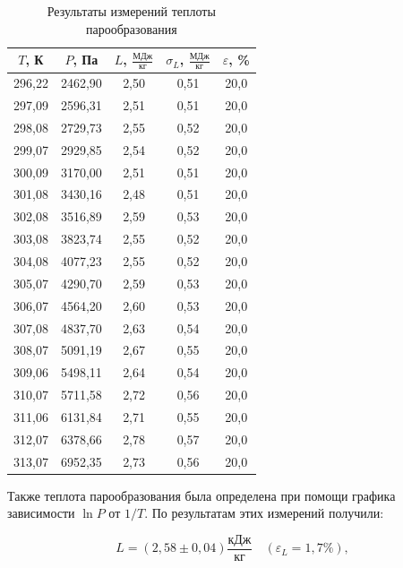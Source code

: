 \documentclass[a4paper, 12pt]{article}
\begin{document}
    \begin{table}[H]
        \centering
        \begin{tabular}{|c|c|c|c|c|}
        \hline
        $ T $, К & $P$, Па & $L$, $\frac{\text{МДж}}{\text{кг}}$ & $\sigma_L $, $\frac{\text{МДж}}{\text{кг}}$ & $\varepsilon $, \% \\ \hline
        296,22 & 2462,90 & 2,50 & 0,51 & 20,0 \\ \hline
        297,09 & 2596,31 & 2,51 & 0,51 & 20,0 \\ \hline
        298,08 & 2729,73 & 2,55 & 0,52 & 20,0 \\ \hline
        299,07 & 2929,85 & 2,54 & 0,52 & 20,0 \\ \hline
        300,09 & 3170,00 & 2,51 & 0,51 & 20,0 \\ \hline
        301,08 & 3430,16 & 2,48 & 0,51 & 20,0 \\ \hline
        302,08 & 3516,89 & 2,59 & 0,53 & 20,0 \\ \hline
        303,08 & 3823,74 & 2,55 & 0,52 & 20,0 \\ \hline
        304,08 & 4077,23 & 2,55 & 0,52 & 20,0 \\ \hline
        305,07 & 4290,70 & 2,59 & 0,53 & 20,0 \\ \hline
        306,07 & 4564,20 & 2,60 & 0,53 & 20,0 \\ \hline
        307,08 & 4837,70 & 2,63 & 0,54 & 20,0 \\ \hline
        308,07 & 5091,19 & 2,67 & 0,55 & 20,0 \\ \hline
        309,06 & 5498,11 & 2,64 & 0,54 & 20,0 \\ \hline
        310,07 & 5711,58 & 2,72 & 0,56 & 20,0 \\ \hline
        311,06 & 6131,84 & 2,71 & 0,55 & 20,0 \\ \hline
        312,07 & 6378,66 & 2,78 & 0,57 & 20,0 \\ \hline
        313,07 & 6952,35 & 2,73 & 0,56 & 20,0 \\ \hline
        \end{tabular}
        \caption{Результаты измерений теплоты парообразования}
	\label{tab:results}
    \end{table}

    \noindent Также теплота парообразования была определена при помощи графика зависимости $\ln P$ от $1/T$. По результатам этих измерений получили:

    \[ \boxed{L = \left(2,58 \pm 0,04\right) \frac{\text{кДж}}{\text{кг}} \quad (\varepsilon_L = 1,7 \%),} \] 
\end{document}

